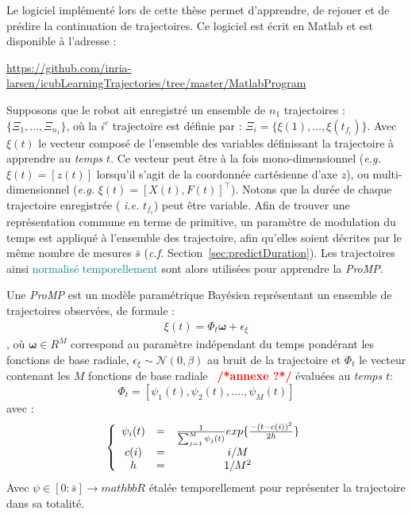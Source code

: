 \documentclass[utf8]{frontiersSCNS} %
\newcommand{\toimprove}[1]{\textcolor{teal}{#1}}
\newcommand{\todo}[1]{\textcolor{red}{\textbf{/*#1*/}}}
\begin{document}
Le logiciel implémenté lors de cette thèse permet d'apprendre, de rejouer et de prédire la continuation de trajectoires. Ce logiciel est écrit en Matlab et est disponible à l'adresse :

\url{https://github.com/inria-larsen/icubLearningTrajectories/tree/master/MatlabProgram}

Supposons que le robot ait enregistré un ensemble de $n_1$ trajectoires : $\{\Xi_1,\ldots, \Xi_{n_1} \}$, où la $i^e$ trajectoire est définie par : $\Xi_i = \{\xi(1), \ldots, \xi(t_{f_i})\}$. 
Avec $\xi(t)$ le vecteur composé de l'ensemble des variables définissant la trajectoire à apprendre au \textit{temps $t$}. Ce vecteur peut être à la fois mono-dimensionnel (\textit{e.g.} $\xi(t) = [z(t)]$ lorsqu'il s'agit de la coordonnée cartésienne d'axe $z$), ou multi-dimensionnel (\textit{e.g.} $\xi(t) = [X(t), F(t)]^\top$). Notons que la durée de chaque trajectoire enregistrée (\textit{ i.e.}  $t_{f_i}$) peut être variable. 
Afin de trouver une représentation commune en terme de primitive, un paramètre de modulation du temps est appliqué à l'ensemble des trajectoire, afin qu'elles soient décrites par le même nombre de mesures $\bar{s}$ (\textit{c.f.}  Section~\ref{sec:predictDuration}). Les trajectoires ainsi \toimprove{normalisé temporellement} sont alors utilisées pour apprendre la \textit{ProMP}.

Une \textit{ProMP} est un modèle paramétrique Bayésien représentant un ensemble de trajectoires observées, de formule : 
\begin{eqnarray}
\xi(t) = \Phi_t \boldsymbol{\omega} + \epsilon_\xi
\end{eqnarray}
, où $\boldsymbol{\omega} \in R^M$ correspond au paramètre indépendant du temps pondérant les fonctions de base radiale, $\epsilon_\xi \sim \mathcal{N}(0, \beta) $ au bruit de la trajectoire et $\Phi_t$  le vecteur contenant les $M$ fonctions de base radiale~\cite{buhmann2000radial} \todo{annexe ?} évaluées au \textit{temps $t$}:
$$ \Phi_{t}=[\psi_{1}(t), \psi_{2}(t), \ldots., \psi_{M}(t)]$$
avec :
\begin{equation} \label{eq:RBF}
\left\lbrace \begin{array}{cccc}
\psi_{i}(t) &=& {1 \over\sum_{j=1}^M \psi_{j}(t) }exp\{{-(t  - c(i))^2 \over {2h}}\} \\
c(i) &=& {i / M}\\
h &=& {1 / M^2}
\end{array} \right. 
\end{equation}
Avec $\psi \in [0: \bar{s}] \rightarrow mathbb{R}$ étalée temporellement pour représenter la trajectoire dans sa totalité.
\end{document}
